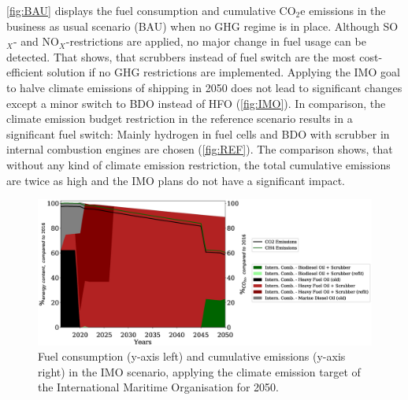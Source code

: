 \documentclass[article]{elsarticle}
\begin{document}
\autoref{fig:BAU} displays the fuel consumption and cumulative CO$_2$e emissions in the business as usual scenario (BAU) when no GHG regime is in place. Although SO$_X$- and NO$_X$-restrictions are applied, no major change in fuel usage can be detected. That shows, that scrubbers instead of fuel switch are the most cost-efficient solution if no GHG restrictions are implemented. Applying the IMO goal to halve climate emissions of shipping in 2050 does not lead to significant changes except a minor switch to BDO instead of HFO (\autoref{fig:IMO}). In comparison, the climate emission budget restriction in the reference scenario  results in a significant fuel switch: Mainly hydrogen in fuel cells and BDO with scrubber in internal combustion engines are chosen (\autoref{fig:REF}). The comparison shows, that without any kind of climate emission restriction, the total cumulative emissions are twice as high and the IMO plans do not have a significant impact. 


\begin{figure}
    \centering
    \includegraphics[width=\textwidth]{figures/IMO_fuels_emissions.eps}
    \caption{Fuel consumption (y-axis left) and cumulative emissions (y-axis right) in the IMO scenario, applying the climate emission target of the International Maritime Organisation for 2050.}
    \label{fig:IMO}
\end{figure}
\end{document}
